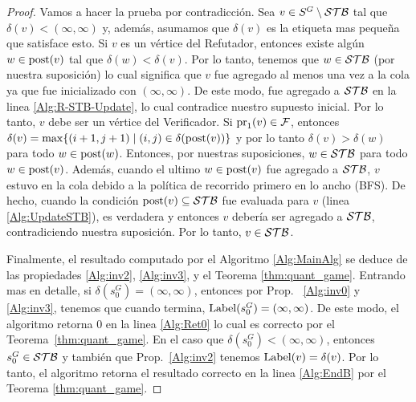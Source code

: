 \begin{proof}
Vamos a hacer la prueba por contradicción. Sea $v \in S^G \setminus \mathcal{STB}$ tal que $\delta(v) < (\infty, \infty)$ y, además, asumamos que
$\delta(v)$ es la etiqueta mas pequeña que satisface esto.
Si $v$ es un vértice del Refutador, entonces existe algún $w \in \operatorname{post}(v)$ tal que $\delta(w) < \delta(v)$. 
Por lo tanto, tenemos que $w \in \mathcal{STB}$ (por nuestra suposición) lo cual significa que $v$ fue agregado al menos una vez a la cola ya que fue inicializado con $(\infty, \infty)$. 
De este modo, fue agregado a $\mathcal{STB}$ en la linea \ref{Alg:R-STB-Update}, lo cual contradice nuestro supuesto inicial. 
Por lo tanto, $v$ debe ser un vértice del Verificador. 
Si $\operatorname{pr}_{1}(v) \in \mathcal{F}$, entonces $\delta(v) = \max \{(i+1,j+1) \mid (i,j) \in \delta(\operatorname{post}(v))\}$ 
y por lo tanto $\delta(v) > \delta(w)$ para todo $w \in \operatorname{post}(w)$.
Entonces, por nuestras suposiciones, $w \in \mathcal{STB}$ para todo $w \in \operatorname{post}(v)$.
Además, cuando el ultimo $w \in \operatorname{post}(v)$ fue agregado a $\mathcal{STB}$, $v$ estuvo en la cola debido a la política de recorrido primero en lo ancho (BFS).
De hecho, cuando la condición $\operatorname{post}(v) \subseteq \mathcal{STB}$ fue evaluada para $v$ (linea \ref{Alg:UpdateSTB}), es verdadera y entonces $v$ 
debería ser agregado a $\mathcal{STB}$, contradiciendo nuestra suposición. Por lo tanto, $v \in \mathcal{STB}$.

Finalmente, el resultado computado por el Algoritmo \ref{Alg:MainAlg} se deduce de las propiedades \ref{Alg:inv2}, \ref{Alg:inv3}, 
y el Teorema \ref{thm:quant_game}. 
Entrando mas en detalle, si $\delta(s_{0}^G) = (\infty, \infty)$, entonces por Prop. ~\ref{Alg:inv0} y \ref{Alg:inv3}, tenemos que cuando termina, $\operatorname{Label}(s_{0}^G) = (\infty, \infty)$. 
De este modo, el algoritmo retorna $0$ en la linea \ref{Alg:Ret0} lo cual es correcto por el Teorema~\ref{thm:quant_game}. 
En el caso que $\delta(s_0^G)< (\infty, \infty)$, entonces $s_0^G \in \mathcal{STB}$ y también que Prop.~\ref{Alg:inv2} tenemos $\operatorname{Label}(v) = \delta(v)$. Por lo tanto, el algoritmo retorna el resultado correcto en la linea \ref{Alg:EndB} por el Teorema \ref{thm:quant_game}. 
\qedhere
\end{proof}





